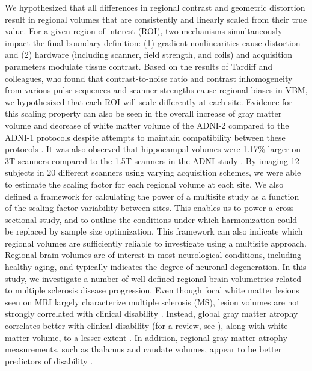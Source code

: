 \documentclass{article}
\begin{document}
We hypothesized that all differences in regional contrast and geometric distortion result in regional volumes that are consistently and linearly scaled from their true value. For a given region of interest (ROI), two mechanisms simultaneously impact the final boundary definition: (1) gradient nonlinearities cause distortion and (2) hardware  (including scanner, field strength, and coils) and acquisition parameters modulate tissue contrast. Based on the results of Tardiff and colleagues, who found that contrast-to-noise ratio and contrast inhomogeneity from various pulse sequences and scanner strengths cause regional biases in VBM\cite{tardif2010regional, tardif2009sensitivity}, we hypothesized that each ROI will scale differently at each site. Evidence for this scaling property can also be seen in the overall increase of gray matter volume and decrease of white matter volume of the ADNI-2 compared to the ADNI-1 protocols despite attempts to maintain compatibility between these protocols \cite{Brunton_2013}. It was also observed that hippocampal volumes were 1.17\% larger on 3T scanners compared to the 1.5T scanners in the ADNI study \cite{Wolz_2014}. By imaging 12 subjects in 20 different scanners using varying acquisition schemes, we were able to estimate the scaling factor for each regional volume at each site. We also defined a framework for calculating the power of a multisite study as a function of the scaling factor variability between sites. This enables us to power a cross-sectional study, and to outline the conditions under which harmonization could be replaced by sample size optimization. This framework can also indicate which regional volumes are sufficiently reliable to investigate using a multisite approach.
Regional brain volumes are of interest in most neurological conditions, including healthy aging, and typically indicates the degree of neuronal degeneration. In this study, we investigate a number of well-defined regional brain volumetrics related to multiple sclerosis disease progression. Even though focal white matter lesions seen on MRI largely characterize multiple sclerosis (MS), lesion volumes are not strongly correlated with clinical disability \cite{lesions1,lesions2,lesions3}. Instead, global gray matter atrophy correlates better with clinical disability (for a review, see \cite{horakova2012clinical}), along with white matter volume, to a lesser extent \cite{white1}. In addition, regional gray matter atrophy measurements, such as thalamus \cite{thal1,thal2,thal3,thal4} and caudate \cite{caud1,caud2} volumes, appear to be better predictors of disability \cite{gm1,gm2,gm3,gm4}.   %
\end{document}
